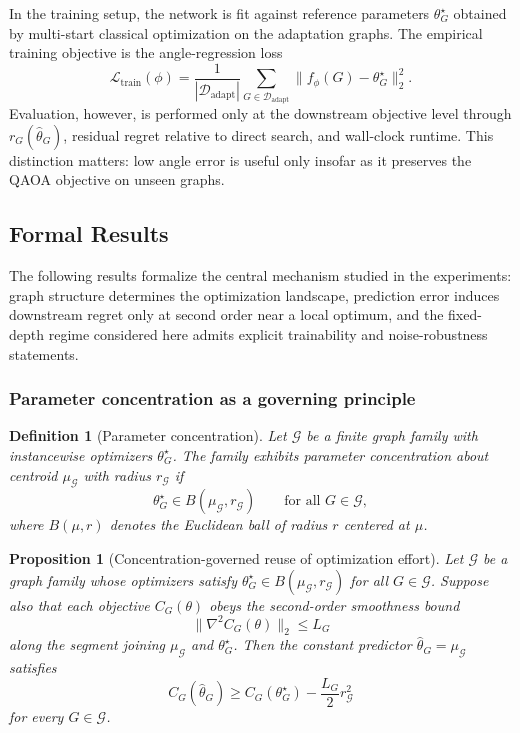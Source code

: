 \documentclass[
  reprint,
  twocolumn,
  aps,
  superscriptaddress,
  longbibliography,
  floatfix
]{revtex4-2}
\newtheorem{proposition}{Proposition}
\newtheorem{definition}{Definition}
\begin{document}
In the training setup, the network is fit against reference parameters $\theta_G^{\star}$ obtained by multi-start classical optimization on the adaptation graphs. The empirical training objective is the angle-regression loss
\begin{equation}
\mathcal{L}_{\mathrm{train}}(\phi) =
\frac{1}{|\mathcal{D}_{\mathrm{adapt}}|}
\sum_{G \in \mathcal{D}_{\mathrm{adapt}}}
\| f_{\phi}(G) - \theta_G^{\star} \|_2^2.
\end{equation}
Evaluation, however, is performed only at the downstream objective level through $r_G(\hat{\theta}_G)$, residual regret relative to direct search, and wall-clock runtime. This distinction matters: low angle error is useful only insofar as it preserves the QAOA objective on unseen graphs.

\subsection{Formal Results}
The following results formalize the central mechanism studied in the experiments: graph structure determines the optimization landscape, prediction error induces downstream regret only at second order near a local optimum, and the fixed-depth regime considered here admits explicit trainability and noise-robustness statements.

\subsubsection{Parameter concentration as a governing principle}

\begin{definition}[Parameter concentration]
Let $\mathcal{G}$ be a finite graph family with instancewise optimizers $\theta_G^\star$. The family exhibits parameter concentration about centroid $\mu_{\mathcal{G}}$ with radius $r_{\mathcal{G}}$ if
\begin{equation}
\theta_G^\star \in B(\mu_{\mathcal{G}}, r_{\mathcal{G}}) \qquad \text{for all } G \in \mathcal{G},
\end{equation}
where $B(\mu,r)$ denotes the Euclidean ball of radius $r$ centered at $\mu$.
\end{definition}

\begin{proposition}[Concentration-governed reuse of optimization effort]
Let $\mathcal{G}$ be a graph family whose optimizers satisfy $\theta_G^\star \in B(\mu_{\mathcal{G}}, r_{\mathcal{G}})$ for all $G \in \mathcal{G}$. Suppose also that each objective $C_G(\theta)$ obeys the second-order smoothness bound
\begin{equation}
\|\nabla^2 C_G(\theta)\|_2 \leq L_G
\end{equation}
along the segment joining $\mu_{\mathcal{G}}$ and $\theta_G^\star$. Then the constant predictor $\hat\theta_G = \mu_{\mathcal{G}}$ satisfies
\begin{equation}
C_G(\hat\theta_G) \ge C_G(\theta_G^\star) - \frac{L_G}{2} r_{\mathcal{G}}^2
\end{equation}
for every $G \in \mathcal{G}$.
\end{proposition}
\end{document}
